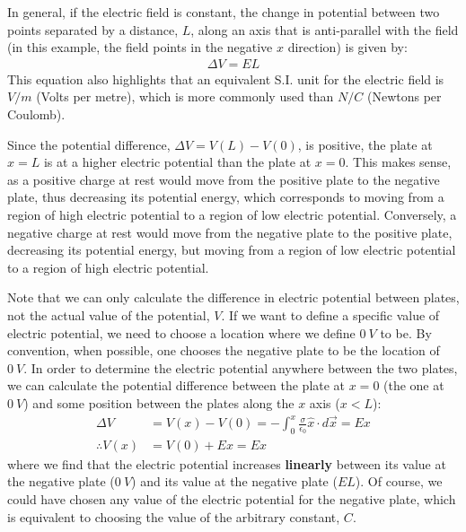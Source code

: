 \begin{example}
In general, if the electric field is constant, the change in potential between two points separated by a distance, $L$, along an axis that is anti-parallel with the field (in this example, the field points in the negative $x$ direction) is given by:
\begin{align*}
\Delta V = EL
\end{align*}
This equation also highlights that an equivalent S.I. unit for the electric field is $\si{V/m}$ (Volts per metre), which is more commonly used than $\si{N/C}$ (Newtons per Coulomb). 

Since the potential difference, $\Delta V=V(L)-V(0)$, is positive, the plate at $x=L$ is at a higher electric potential than the plate at $x=0$. This makes sense, as a positive charge at rest would move from the positive plate to the negative plate, thus decreasing its potential energy, which corresponds to moving from a region of high electric potential to a region of low electric potential. Conversely, a negative charge at rest would move from the negative plate to the positive plate, decreasing its potential energy, but moving from a region of low electric potential to a region of high electric potential. 

Note that we can only calculate the difference in electric potential between plates, not the actual value of the potential, $V$. If we want to define a specific value of electric potential, we need to choose a location where we define $\SI{0}{V}$ to be. By convention, when possible, one chooses the negative plate to be the location of $\SI{0}{V}$. In order to determine the electric potential anywhere between the two plates, we can calculate the potential difference between the plate at $x=0$ (the one at $\SI{0}{V}$) and some position between the plates along the $x$ axis ($x<L$):
\begin{align*}
\Delta V &=V(x)-V(0)=-\int_0^x\frac{\sigma}{\epsilon_0} \hat x \cdot d\vec x= Ex\\
\therefore V(x)&=V(0)+Ex=Ex
\end{align*}
where we find that the electric potential increases \textbf{linearly} between its value at the negative plate ($\SI{0}{V}$) and its value at the negative plate ($EL$). Of course, we could have chosen any value of the electric potential for the negative plate, which is equivalent to choosing the value of the arbitrary constant, $C$.


\end{example}
